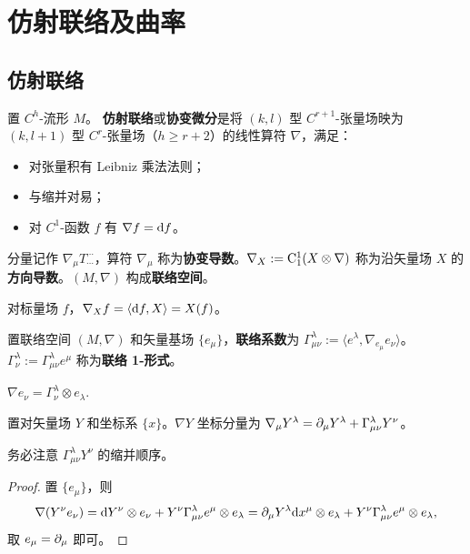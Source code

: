 \chapter{仿射联络及曲率}\label{appx:curvature}
\section{仿射联络}

\begin{definition}
    置 $C^{h}$-流形 $M$。
    \textbf{仿射联络}或\textbf{协变微分}是将 $(k,l)$ 型 $C^{r+1}$-张量场映为 $(k,l+1)$ 型 $C^{r}$-张量场（$h\geqslant r+2$）的线性算符 $\nabla$，满足：
    \begin{itemize}
        \item 对张量积有 Leibniz 乘法法则；
        \item 与缩并对易；
        \item 对 $C^1$-函数 $f$ 有 $\nabla f=\dd f$。
    \end{itemize}
    分量记作 $\nabla_\mu T^{\cdots}_{\cdots}$，算符 $\nabla_\mu$ 称为\textbf{协变导数}。$\nabla_X:=\mathrm{C}^1_1(X\otimes\nabla)$ 称为沿矢量场 $X$ 的\textbf{方向导数}。$(M,\nabla)$ 构成\textbf{联络空间}。
\end{definition}

\begin{example}
    对标量场 $f$，$\nabla_X f=\langle\dd f,X\rangle=X(f)$。
\end{example}

\begin{definition}\label{def:connection-one-form}
    置联络空间 $(M,\nabla)$ 和矢量基场 $\{e_\mu\}$，\textbf{联络系数}为 $\Gamma^\lambda_{\mu\nu}:=\langle e^\lambda,\nabla_{e_\mu} e_\nu\rangle$。
    $\Gamma^\lambda_\nu:=\Gamma^\lambda_{\mu\nu} e^\mu$ 称为\textbf{联络 1-形式}。
\end{definition}

\begin{theorem}
    $\nabla e_\nu=\Gamma^\lambda_\nu\otimes e_\lambda.$
\end{theorem}

\begin{theorem}
    置对矢量场 $Y$ 和坐标系 $\{x\}$。$\nabla Y$ 坐标分量为 $\nabla_\mu Y^\lambda=\partial_\mu Y^\lambda+\Gamma^\lambda_{\mu\nu}Y^\nu$。
\end{theorem}
\begin{remark}
    务必注意 $\Gamma^\lambda_{\mu\nu}Y^\nu$ 的缩并顺序。
\end{remark}
\begin{proof}置 $\{e_\mu\}$，则
    \[\nabla(Y^\nu e_\nu)=\dd Y^\nu\otimes e_\nu+Y^\nu \Gamma^\lambda_{\mu\nu} e^\mu\otimes e_\lambda=\partial_\mu Y^\lambda\dd x^\mu\otimes e_\lambda+Y^\nu \Gamma^\lambda_{\mu\nu} e^\mu\otimes e_\lambda,\]
    取 $e_\mu=\partial_\mu$ 即可。
\end{proof}

